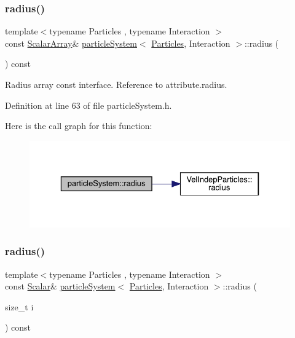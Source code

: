 \subsubsection{\texorpdfstring{radius()}{radius()}\hspace{0.1cm}{\footnotesize\ttfamily [1/2]}}
{\footnotesize\ttfamily template$<$typename Particles , typename Interaction $>$ \\
const \mbox{\hyperlink{classparticle_system_a7f143d2466bd0f78d79cccd3493a756b}{Scalar\+Array}}\& \mbox{\hyperlink{classparticle_system}{particle\+System}}$<$ \mbox{\hyperlink{struct_particles}{Particles}}, Interaction $>$\+::radius (\begin{DoxyParamCaption}{ }\end{DoxyParamCaption}) const\hspace{0.3cm}{\ttfamily [inline]}}



Radius array const interface. Reference to attribute.\+radius. 



Definition at line 63 of file particle\+System.\+h.

Here is the call graph for this function\+:\nopagebreak
\begin{figure}[H]
\begin{center}
\leavevmode
\includegraphics[width=329pt]{classparticle_system_aed99ea79678f0233119ebc28d2b9822d_cgraph}
\end{center}
\end{figure}
\mbox{\label{classparticle_system_a1986f65f13b773a51b19eba1ccd6c46a}} 
\subsubsection{\texorpdfstring{radius()}{radius()}\hspace{0.1cm}{\footnotesize\ttfamily [2/2]}}
{\footnotesize\ttfamily template$<$typename Particles , typename Interaction $>$ \\
const \mbox{\hyperlink{classparticle_system_a3938954186247e3eab01cc75fcc62b40}{Scalar}}\& \mbox{\hyperlink{classparticle_system}{particle\+System}}$<$ \mbox{\hyperlink{struct_particles}{Particles}}, Interaction $>$\+::radius (\begin{DoxyParamCaption}\item[{size\+\_\+t}]{i }\end{DoxyParamCaption}) const\hspace{0.3cm}{\ttfamily [inline]}}



